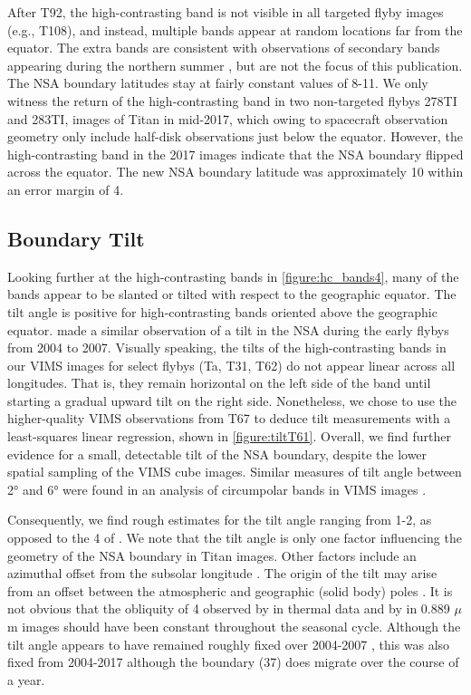 \documentclass[apj,tighten]{emulateapj}
\begin{document}
After T92, the high-contrasting band is not visible in all targeted flyby images (e.g., T108), and instead, multiple bands appear at random locations far from the equator. 
The extra bands are consistent with observations of secondary bands appearing during the northern summer \citep{kutsop2022titan}, but are not the focus of this publication. The NSA boundary latitudes stay at fairly constant values of 8-11.
We only witness the return of the high-contrasting band in two non-targeted flybys 278TI and 283TI, images of Titan in mid-2017, which owing to spacecraft observation geometry only include half-disk observations just below the equator.
However, the high-contrasting band in the 2017 images indicate that the NSA boundary flipped across the equator.
The new NSA boundary latitude was approximately 10 within an error margin of 4\degree{}. 



\subsection{Boundary Tilt}
Looking further at the high-contrasting bands in \autoref{figure:hc_bands4}, many of the bands appear to be slanted or tilted with respect to the geographic equator. 
The tilt angle is positive for  high-contrasting bands oriented above the geographic equator. 
\cite{Roman2009} made a similar observation of a tilt in the NSA during the early flybys from 2004 to 2007.
Visually speaking, the tilts of the high-contrasting bands in our VIMS images for select flybys (Ta, T31, T62) do not appear linear across all longitudes.
That is, they remain horizontal on the left side of the band until starting a gradual upward tilt on the right side. Nonetheless, we chose to use the higher-quality VIMS observations from T67 to deduce tilt measurements with a least-squares linear regression, shown in \autoref{figure:tiltT61}. 
Overall, we find further evidence for a small, detectable tilt of the NSA boundary, despite the lower spatial sampling of the VIMS cube images. 
Similar measures of tilt angle between 2° and 6° were found in an analysis of circumpolar bands in VIMS images \citep{kutsop2022titan}.

Consequently, we find rough estimates for the tilt angle ranging from 1-2\degree{}, as opposed to the 4\degree{} of \cite{Roman2009}. We note that the tilt angle is only one factor influencing the geometry of the NSA boundary in Titan images.
Other factors include an azimuthal offset from the subsolar longitude \citep{Roman2009}.
The origin of the tilt may arise from an offset between the atmospheric and geographic (solid body) poles \citep{Roman2009}. 
It is not obvious that the obliquity of 4\degree{} observed by \cite{achterberg2008titan} in thermal data and by \cite{Roman2009} in 0.889 $\mu$m images should have been constant throughout the seasonal cycle.
Although the tilt angle appears to have remained roughly fixed over 2004-2007 \citep{Roman2009}, this was also fixed from 2004-2017 although the boundary (37\degree{}) does migrate over the course of a year.
\end{document}
